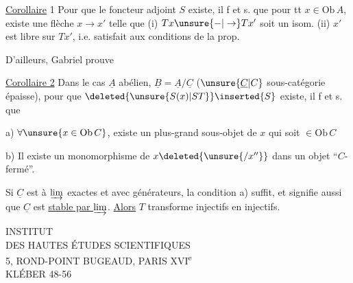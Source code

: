 


\uline{Corollaire} 1 Pour que le foncteur adjoint $S$ existe, il f et s. que pour tt $x\in\mathrm{Ob}\,A$, existe une flèche $x\to x'$ telle que (i) $Tx\unsure{-|\to}Tx'$ soit un isom. (ii) $x'$ est libre sur $Tx'$, i.e. satisfait aux conditions de la prop.

D'ailleurs, Gabriel prouve

\uline{Corollaire 2}  Dans le cas $\underline A$ abélien, $\underline B=\underline A/\underline C$ ($\unsure{\underline C|C}$ sous-catégorie épaisse), pour que $\deleted{\unsure{S(x)|ST}}\inserted{S}$ existe, il f et s. que

a) $\forall\unsure{x\in\mathrm{Ob}\,C}$, existe un plus-grand sous-objet  de $x$ qui soit $\in\mathrm{Ob}\,C$


b)  Il existe un monomorphisme de $x\deleted{\unsure{/x''}}$ dans un objet ``$C$-fermé''.

Si $\underline C$ est à $\varinjlim$ exactes et avec générateurs, la condition a) suffit, et signifie aussi que $\underline C$ est \uline{\uline{stable} par $\varinjlim$}. \uline{Alors} $T$ transforme injectifs en injectifs.

\begin{center}
INSTITUT\\
DES HAUTES ÉTUDES SCIENTIFIQUES\\
5, ROND-POINT BUGEAUD, PARIS XVI\textsuperscript{e}\\
KLÉBER 48-56
\end{center}

